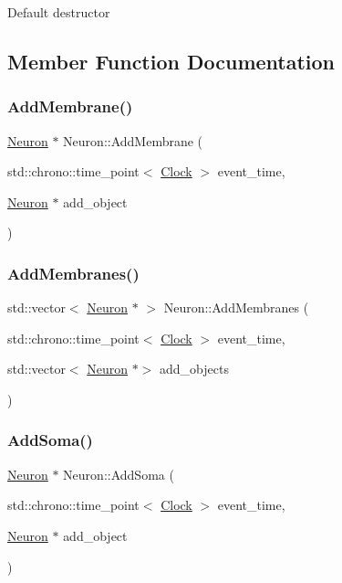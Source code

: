 Default destructor 

\subsection{Member Function Documentation}
\mbox{\label{classNeuron_a99d4b64f128e2bfbffec3c5d476a2ca3}} 
\subsubsection{\texorpdfstring{Add\+Membrane()}{AddMembrane()}}
{\footnotesize\ttfamily \mbox{\hyperlink{classNeuron}{Neuron}} $\ast$ Neuron\+::\+Add\+Membrane (\begin{DoxyParamCaption}\item[{std\+::chrono\+::time\+\_\+point$<$ \mbox{\hyperlink{universe_8h_a0ef8d951d1ca5ab3cfaf7ab4c7a6fd80}{Clock}} $>$}]{event\+\_\+time,  }\item[{\mbox{\hyperlink{classNeuron}{Neuron}} $\ast$}]{add\+\_\+object }\end{DoxyParamCaption})}

\mbox{\label{classNeuron_a9e1f79bf8e991893f4ef318841932a13}} 
\subsubsection{\texorpdfstring{Add\+Membranes()}{AddMembranes()}}
{\footnotesize\ttfamily std\+::vector$<$ \mbox{\hyperlink{classNeuron}{Neuron}} $\ast$ $>$ Neuron\+::\+Add\+Membranes (\begin{DoxyParamCaption}\item[{std\+::chrono\+::time\+\_\+point$<$ \mbox{\hyperlink{universe_8h_a0ef8d951d1ca5ab3cfaf7ab4c7a6fd80}{Clock}} $>$}]{event\+\_\+time,  }\item[{std\+::vector$<$ \mbox{\hyperlink{classNeuron}{Neuron}} $\ast$$>$}]{add\+\_\+objects }\end{DoxyParamCaption})}

\mbox{\label{classNeuron_a6198fa352056e3bbe1e979adf088b900}} 
\subsubsection{\texorpdfstring{Add\+Soma()}{AddSoma()}}
{\footnotesize\ttfamily \mbox{\hyperlink{classNeuron}{Neuron}} $\ast$ Neuron\+::\+Add\+Soma (\begin{DoxyParamCaption}\item[{std\+::chrono\+::time\+\_\+point$<$ \mbox{\hyperlink{universe_8h_a0ef8d951d1ca5ab3cfaf7ab4c7a6fd80}{Clock}} $>$}]{event\+\_\+time,  }\item[{\mbox{\hyperlink{classNeuron}{Neuron}} $\ast$}]{add\+\_\+object }\end{DoxyParamCaption})}

